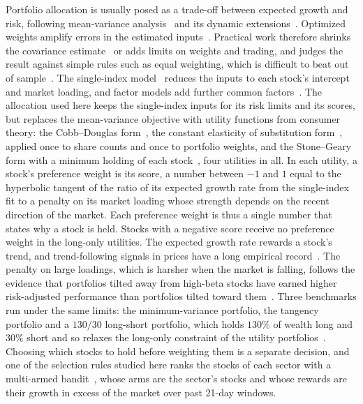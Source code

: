 Portfolio allocation is usually posed as a trade-off between expected growth and risk, following mean-variance
analysis~\cite{markowitz1952} and its dynamic extensions~\cite{merton1969}. Optimized weights amplify errors in the
estimated inputs~\cite{michaud1989}. Practical work therefore shrinks the covariance estimate~\cite{ledoitWolf2004}
or adds limits on weights and trading, and judges the result against simple rules such as equal weighting, which is
difficult to beat out of sample~\cite{demiguelGarlappiUppal2009}. The single-index model~\cite{sharpe1963} reduces
the inputs to each stock's intercept and market loading, and factor models add further common
factors~\cite{famaFrench1993}. The allocation used here keeps the single-index inputs for its risk limits and its
scores, but replaces the mean-variance objective with utility functions from consumer theory: the Cobb--Douglas
form~\cite{cobbDouglas1928}, the constant elasticity of substitution form~\cite{arrowEtAl1961}, applied once to
share counts and once to portfolio weights, and the Stone--Geary form with a minimum holding of each
stock~\cite{stone1954, geary1950}, four utilities in all. In each utility, a stock's preference weight is its score,
a number between $-1$ and $1$ equal to the hyperbolic tangent of the ratio of its expected growth rate from the
single-index fit to a penalty on its market loading whose strength depends on the recent direction of the market. Each
preference weight is thus a single number that states why a stock is held. Stocks with a negative score receive no
preference weight in the long-only utilities. The expected growth rate rewards a stock's trend, and trend-following
signals in prices have a long empirical record~\cite{brockLakonishokLeBaron1992, moskowitzOoiPedersen2012}. The
penalty on large loadings, which is harsher when the market is falling, follows the evidence that portfolios tilted
away from high-beta stocks have earned higher risk-adjusted performance than portfolios tilted toward
them~\cite{frazziniPedersen2014}. Three benchmarks run under the same limits: the minimum-variance portfolio, the
tangency portfolio and a $130/30$ long-short portfolio, which holds $130\%$ of wealth long and $30\%$ short and so
relaxes the long-only constraint of the utility portfolios~\cite{jacobsLevyStarer1998}. Choosing which stocks to
hold before weighting them is a separate decision, and one of the selection rules studied here ranks the stocks of
each sector with a multi-armed bandit~\cite{lattimoreSzepesvari2020}, whose arms are the sector's stocks and whose
rewards are their growth in excess of the market over past 21-day windows.

